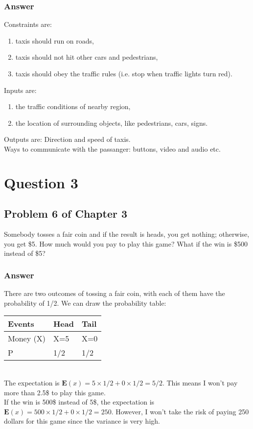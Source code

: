 \documentclass{article}
\begin{document}
\subsubsection*{Answer}

Constraints are: 
\begin{enumerate}
    \item taxis should run on roads,
    \item taxis should not hit other cars and pedestrians,
    \item taxis should obey the traffic rules (i.e. stop when traffic lights turn red).
\end{enumerate}

\noindent Inputs are: 
\begin{enumerate}
    \item the traffic conditions of nearby region,
    \item the location of surrounding objects, like pedestrians, cars, signs.
\end{enumerate}

\noindent Outputs are: Direction and speed of taxis.\\

\noindent Ways to communicate with the passanger: buttons, video and audio etc.

\section*{Question 3}
\subsection*{Problem 6 of Chapter 3}
Somebody tosses a fair coin and if the result is heads, you get nothing; otherwise, you get \$5. How much would you pay to play this game? What if the win is \$500 instead of \$5?

\subsubsection*{Answer}
There are two outcomes of tossing a fair coin, with each of them have the probability of 1/2. We can draw the probability table:
\begin{table}[h]
    \begin{tabular}{|l|l|l|}
    \hline
    Events & Head  & Tail  \\ \hline
    Money (X)  & X=5     & X=0     \\ \hline
    P      & 1/2 & 1/2 \\ \hline
    \end{tabular}
    \end{table}
\\The expectation is $\mathbf{E}(x) = 5\times 1/2 + 0 \times 1/2 = 5/2$. This means I won't pay more than 2.5\$ to play this game.
\\If the win is 500\$ instead of 5\$, the expectation is $\mathbf{E}(x) = 500\times 1/2 + 0 \times 1/2 = 250$. However, I won't take the risk of paying 250 dollars for this game since the variance is very high. 
\end{document}
